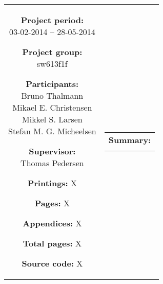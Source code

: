 \begin{titlepage}
\begin{nopagebreak}
{\begin{tabular}{cc}
{	\parbox{8cm}{
	\begin{description}
		\item { \textbf{Project period:}}\\
			03-02-2014 -- 28-05-2014
 		\hspace{4cm}
		\item { \textbf{Project group:}}\\
  			sw613f1f
 		\hspace{4cm}
		\item {\textbf{Participants:}}\\
			Bruno Thalmann\\
			Mikael E. Christensen\\
			Mikkel S. Larsen\\
			Stefan M. G. Micheelsen\\
		\hspace{2cm}
		\item { \textbf{Supervisor:}}\\
 			Thomas Pedersen\\
  	\end{description}
	}
	\begin{description}
		\item { \textbf{Printings:} X}
		\item { \textbf{Pages:} X } 
		\item { \textbf{Appendices:} X}
		\item { \textbf{Total pages:} X }
		\item { \textbf{Source code:} X}
	\end{description}
	\vfill } &
	\parbox{6.5cm}{
 	 \vspace{.15cm}
  	\hfill 
  	\begin{tabular}{l}
  		{ \textbf{Summary:}}\bigskip \\
  		\fbox{
  		\parbox{6cm}{\bigskip
     		{\vfill{\footnotesize 
     		\bigskip}}
     	}}
   	\end{tabular}}
\end{tabular}
}%
\\
\vfill
{}
\end{nopagebreak}
\end{titlepage}